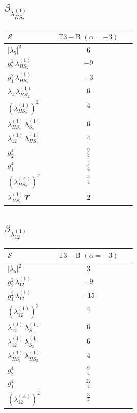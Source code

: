 \documentclass[9pt]{article}
\begin{document}
\subsection*{$ \beta_{\lambda_{HS_2}^{(1)}} $}
\begin{longtable}{@{}p{0.31\linewidth}c@{}}
\toprule
$\mathcal{S}$ & $ \mathrm{T3-B}\;(\alpha=-3) $ \\
\midrule
$ |\lambda_5|^2 $ & $ 6 $ \\
$ g_2^2\,\lambda_{HS_2}^{(1)} $ & $ -9 $ \\
$ g_1^2\,\lambda_{HS_2}^{(1)} $ & $ -3 $ \\
$ \lambda_1\,\lambda_{HS_2}^{(1)} $ & $ 6 $ \\
$ \left(\lambda_{HS_2}^{(1)}\right)^2 $ & $ 4 $ \\
$ \lambda_{HS_2}^{(1)}\,\lambda_{S_2}^{(1)} $ & $ 6 $ \\
$ \lambda_{12}^{(1)}\,\lambda_{HS_1}^{(1)} $ & $ 4 $ \\
$ g_2^4 $ & $ \frac{9}{4} $ \\
$ g_1^4 $ & $ \frac{3}{4} $ \\
$ \left(\lambda_{HS_2}^{(A)}\right)^2 $ & $ \frac{3}{4} $ \\
$ \lambda_{HS_2}^{(1)}\,T $ & $ 2 $ \\
\bottomrule
\end{longtable}
\subsection*{$ \beta_{\lambda_{12}^{(1)}} $}
\begin{longtable}{@{}p{0.31\linewidth}c@{}}
\toprule
$\mathcal{S}$ & $ \mathrm{T3-B}\;(\alpha=-3) $ \\
\midrule
$ |\lambda_5|^2 $ & $ 3 $ \\
$ g_2^2\,\lambda_{12}^{(1)} $ & $ -9 $ \\
$ g_1^2\,\lambda_{12}^{(1)} $ & $ -15 $ \\
$ \left(\lambda_{12}^{(1)}\right)^2 $ & $ 4 $ \\
$ \lambda_{12}^{(1)}\,\lambda_{S_1}^{(1)} $ & $ 6 $ \\
$ \lambda_{12}^{(1)}\,\lambda_{S_2}^{(1)} $ & $ 6 $ \\
$ \lambda_{HS_1}^{(1)}\,\lambda_{HS_2}^{(1)} $ & $ 4 $ \\
$ g_2^4 $ & $ \frac{9}{4} $ \\
$ g_1^4 $ & $ \frac{27}{4} $ \\
$ \left(\lambda_{12}^{(A)}\right)^2 $ & $ \frac{3}{4} $ \\
\bottomrule
\end{longtable}
\end{document}
